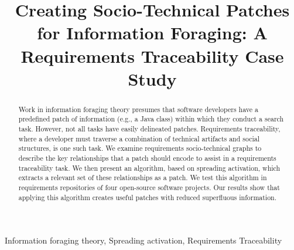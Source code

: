 \documentclass[conference]{IEEEtran}
\begin{document}
\title{Creating Socio-Technical Patches for Information Foraging: A Requirements Traceability Case Study}

\author{
}


\maketitle

\begin{abstract}
Work in information foraging theory presumes that software developers have a predefined patch of information (e.g., a Java class) within which they conduct a search task. However, not all tasks have easily delineated patches. Requirements traceability, where a developer must traverse a combination of technical artifacts and social structures, is one such task. We examine requirements socio-technical graphs to describe the key relationships that a patch should encode to assist in a requirements traceability task. We then present an algorithm, based on spreading activation, which extracts a relevant set of these relationships as a patch. We test this algorithm in requirements repositories of four open-source software projects. Our results show that applying this algorithm creates useful patches with reduced superfluous information.
\end{abstract}

\begin{IEEEkeywords}
Information foraging theory, Spreading activation, Requirements Traceability
\end{IEEEkeywords}

\end{document}
